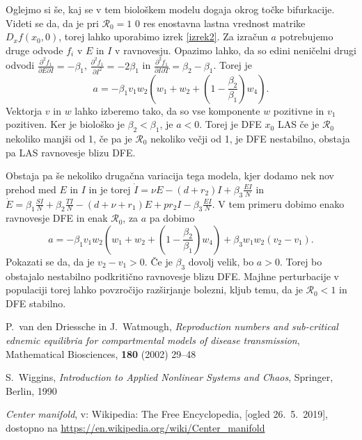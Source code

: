 \documentclass[a4paper,12pt]{article}
\newcommand{\R}{\mathcal R}
\begin{document}
Oglejmo si še, kaj se v tem biološkem modelu dogaja okrog točke bifurkacije. 
Videti se da, da je pri \(\R_0=1\) \(0\) res enostavna lastna vrednost matrike 
\(D_xf(x_0,0)\), torej lahko uporabimo izrek \ref{izrek2}. Za izračun \(a\) potrebujemo 
druge odvode \(f_i\) v \(E\) in \(I\) v ravnovesju. Opazimo lahko, da so edini neničelni drugi odvodi
\(\frac{\partial^2f_1}{\partial E \partial I}=-\beta_1\), 
\(\frac{\partial^2f_1}{\partial I^2}=-2\beta_1\) in 
\(\frac{\partial^2f_1}{\partial I \partial T}=\beta_2-\beta_1\). 
Torej je \[a=-\beta_1 v_1 w_2(w_1+w_2+(1-\frac{\beta_2}{\beta_1})w_4).\]
Vektorja \(v\) in \(w\) lahko izberemo tako, da so vse komponente \(w\) pozitivne 
in \(v_1\) pozitiven. Ker je biološko je \(\beta_2<\beta_1\), je \(a<0\). 
Torej je DFE \(x_0\) LAS če je \(\R_0\) nekoliko manjši od 1, če pa je \(\R_0\) nekoliko večji od 1,
je DFE nestabilno, obstaja pa LAS ravnovesje blizu DFE. 

Obstaja pa še nekoliko drugačna variacija tega modela, kjer dodamo 
nek nov prehod med \(E\) in \(I\) in je torej 
\(\dot{I}=\nu E -(d+r_2)I +\beta_3 \frac{EI}{N}\) in \(\dot{E}= \beta_1\frac{SI}{N}+\beta_2\frac{TI}{N}-(d+\nu+r_1)E+pr_2I-\beta_3 \frac{EI}{N}\).
V tem primeru dobimo enako ravnovesje DFE in enak \(\R_0\), za \(a\) pa dobimo 
\[a=-\beta_1v_1w_2(w_1+w_2+(1-\frac{\beta_2}{\beta_1})w_4)+\beta_3w_1w_2(v_2-v_1).\]
Pokazati se da, da je \(v_2-v_1>0\). Če je \(\beta_3\) dovolj velik, bo \(a>0\). 
Torej bo obstajalo nestabilno podkritično ravnovesje blizu DFE. Majhne perturbacije v populaciji 
torej lahko povzročijo razširjanje bolezni, kljub temu, da je \(\R_0<1\) in DFE stabilno.

\begin{thebibliography}{99}

    P.~van den Driessche in J.~Watmough, \emph{Reproduction numbers and sub-critical ednemic equilibria for compartmental models of disease transmission}, 
    Mathematical Biosciences, \textbf{180} (2002) 29--48
    
    S.~Wiggins, \emph{Introduction to Applied Nonlinear Systems and Chaos}, Springer, Berlin, 1990

    \emph{Center manifold}, v: Wikipedia: The Free Encyclopedia, [ogled 26.~5.~2019], dostopno na \url{https://en.wikipedia.org/wiki/Center_manifold}
\end{thebibliography}
\end{document}
